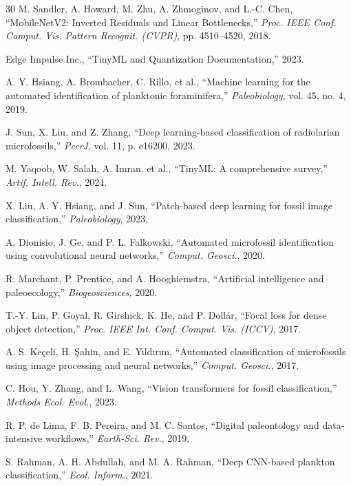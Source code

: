 \documentclass[a4paper,fleqn]{cas-sc}
\begin{document}
\begin{thebibliography}{30}
M. Sandler, A. Howard, M. Zhu, A. Zhmoginov, and L.-C. Chen, ``MobileNetV2: Inverted
Residuals and Linear Bottlenecks,'' \emph{Proc. IEEE Conf. Comput. Vis. Pattern Recognit. (CVPR)}, pp. 4510--4520, 2018.

Edge Impulse Inc., ``TinyML and Quantization Documentation,'' 2023.

A. Y. Hsiang, A. Brombacher, C. Rillo, et al., ``Machine learning for the automated
identification of planktonic foraminifera,'' \emph{Paleobiology}, vol. 45, no. 4, 2019.

J. Sun, X. Liu, and Z. Zhang, ``Deep learning-based classification of radiolarian microfossils,''
\emph{PeerJ}, vol. 11, p. e16200, 2023.

M. Yaqoob, W. Salah, A. Imran, et al., ``TinyML: A comprehensive survey,'' \emph{Artif. Intell. Rev.}, 2024.

X. Liu, A. Y. Hsiang, and J. Sun, ``Patch-based deep learning for fossil image classification,''
\emph{Paleobiology}, 2023.

A. Dionisio, J. Ge, and P. L. Falkowski, ``Automated microfossil identification using
convolutional neural networks,'' \emph{Comput. Geosci.}, 2020.

R. Marchant, P. Prentice, and A. Hooghiemstra, ``Artificial intelligence and paleoecology,''
\emph{Biogeosciences}, 2020.

T.-Y. Lin, P. Goyal, R. Girshick, K. He, and P. Doll\'{a}r, ``Focal loss for dense object detection,''
\emph{Proc. IEEE Int. Conf. Comput. Vis. (ICCV)}, 2017.

A. S. Ke\c{c}eli, H. \c{S}ahin, and E. Y\i{}ld\i{}r\i{}m, ``Automated classification of microfossils using
image processing and neural networks,'' \emph{Comput. Geosci.}, 2017.

C. Hou, Y. Zhang, and L. Wang, ``Vision transformers for fossil classification,'' \emph{Methods Ecol. Evol.}, 2023.

R. P. de Lima, F. B. Pereira, and M. C. Santos, ``Digital paleontology and data-intensive
workflows,'' \emph{Earth-Sci. Rev.}, 2019.

S. Rahman, A. H. Abdullah, and M. A. Rahman, ``Deep CNN-based plankton classification,''
\emph{Ecol. Inform.}, 2021.


\end{thebibliography}
\end{document}
